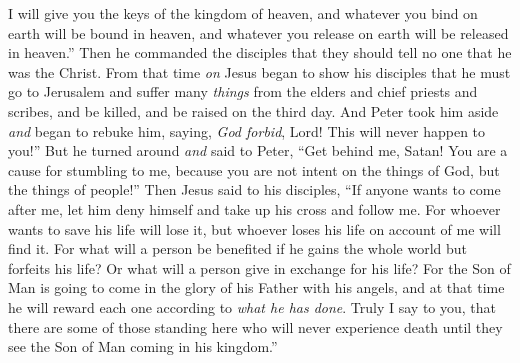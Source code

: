 \begin{biblechapter}
\verse I will give you the keys of the kingdom of heaven, and whatever you bind on earth will be bound in heaven, and whatever you release on earth will be released in heaven.”
\verse Then he commanded the disciples that they should tell no one that he was the Christ.
 From that time \textit{on} Jesus began to show his disciples that he must go to Jerusalem and suffer many \textit{things} from the elders and chief priests and scribes, and be killed, and be raised on the third day.
\verse And Peter took him aside \textit{and} began to rebuke him, saying, \textit{God forbid}, Lord! This will never happen to you!”
\verse But he turned around \textit{and} said to Peter, “Get behind me, Satan! You are a cause for stumbling to me, because you are not intent on the things of God, but the things of people!”
 Then Jesus said to his disciples, “If anyone wants to come after me, let him deny himself and take up his cross and follow me.
\verse For whoever wants to save his life will lose it, but whoever loses his life on account of me will find it.
\verse For what will a person be benefited if he gains the whole world but forfeits his life? Or what will a person give in exchange for his life?
\verse For the Son of Man is going to come in the glory of his Father with his angels, and at that time he will reward each one according to \textit{what he has done}.
\verse Truly I say to you, that there are some of those standing here who will never experience death until they see the Son of Man coming in his kingdom.”
\end{biblechapter}

